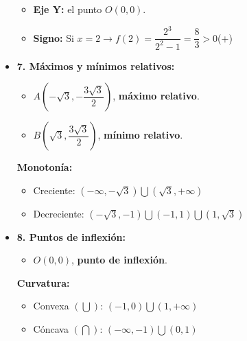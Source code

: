 \begin{itemize}
\begin{itemize}
		\item \textbf{Eje Y: }el punto $O(0,0)$.
		\item \textbf{Signo: }Si $x=2 \rightarrow f(2)=\dfrac{2^3}{2^2-1}=\dfrac{8}{3}>0$(+)
	\end{itemize}
	\item \textbf{7. Máximos y mínimos relativos:}\\
	\begin{itemize}
		\item $A(-\sqrt{3}, -\dfrac{3\sqrt{3}}{2})$, \textbf{máximo relativo}.\\
		\item $B(\sqrt{3}, \dfrac{3\sqrt{3}}{2})$, \textbf{mínimo relativo}.
	\end{itemize}
	\textbf{Monotonía: }\\
	\begin{itemize}
		\item Creciente: $(-\infty, -\sqrt{3}) \bigcup (\sqrt{3}, +\infty)$
		\item Decreciente: $(-\sqrt{3}, -1) \bigcup (-1, 1) \bigcup (1, \sqrt{3})$
	\end{itemize}
	\item \textbf{8. Puntos de inflexión:}\\
	\begin{itemize}
		\item $ O(0,0)$, \textbf{punto de inflexión}.
	\end{itemize}
	\textbf{Curvatura:}\\
	\begin{itemize}
		\item Convexa $(\bigcup)$: $(-1, 0) \bigcup (1, +\infty)$
		\item Cóncava $(\bigcap)$: $(-\infty, -1) \bigcup (0,1)$
	\end{itemize}	
\end{itemize}

